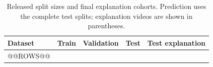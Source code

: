 \begin{table}[!htbp]\centering\small
\caption{Released split sizes and final explanation cohorts. Prediction uses the complete test splits; explanation videos are shown in parentheses.}\label{tab:data}
\begin{tabular}{lrrrr}\toprule
Dataset & Train & Validation & Test & Test explanation\\\midrule
@@ROWS@@
\bottomrule
\end{tabular}\end{table}
